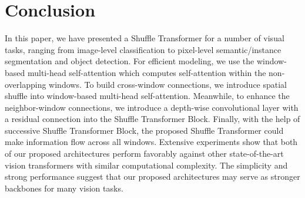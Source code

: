 \documentclass{article}
\begin{document}
\section{Conclusion}
In this paper, we have presented a Shuffle Transformer for a number of visual tasks, ranging from image-level
classification to pixel-level semantic/instance segmentation and object detection. For efficient modeling, we use the window-based multi-head self-attention which computes self-attention within the non-overlapping windows. To build cross-window connections, we introduce spatial shuffle into window-based multi-head self-attention. Meanwhile, to enhance the neighbor-window connections, we introduce a depth-wise convolutional layer with a residual connection into the Shuffle Transformer Block. Finally, with the help of successive Shuffle Transformer Block, the proposed Shuffle Transformer could make information flow across all windows. Extensive experiments show that both of our proposed architectures perform favorably against other state-of-the-art vision transformers with similar computational complexity. The simplicity and strong performance suggest that our proposed architectures may serve as stronger backbones for many vision tasks.

{\small


}
\end{document}
